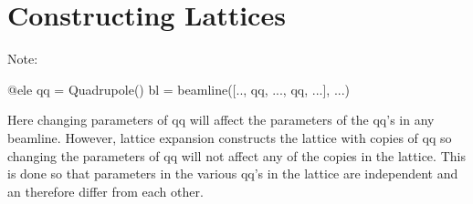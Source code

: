 \chapter{Constructing Lattices}
\label{c:construct-lat}

Note: 
\begin{example}
  @ele qq = Quadrupole()
  bl = beamline([.., qq, ..., qq, ...], ...)
\end{example}
Here changing parameters of qq will affect the parameters of the qq's in any beamline.
However, lattice expansion constructs the lattice with copies of qq so changing the
parameters of qq will not affect any of the copies in the lattice. This is done so that
parameters in the various qq's in the lattice are independent and an therefore differ from each
other. 
